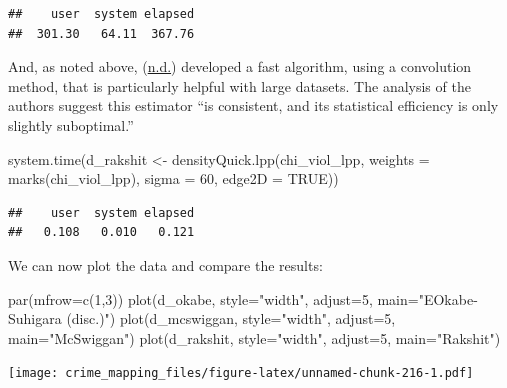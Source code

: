\documentclass[
  krantz2]{krantz}
\makeatletter
\newenvironment{Shaded}{\begin{snugshade}}{\end{snugshade}}
\newcommand{\AttributeTok}[1]{\textcolor[rgb]{0.61,0.61,0.61}{#1}}
\newcommand{\ConstantTok}[1]{\textcolor[rgb]{0,0,0}{#1}}
\newcommand{\DecValTok}[1]{\textcolor[rgb]{0.06,0.06,0.06}{#1}}
\newcommand{\FunctionTok}[1]{\textcolor[rgb]{0,0,0}{#1}}
\newcommand{\NormalTok}[1]{#1}
\newcommand{\OtherTok}[1]{\textcolor[rgb]{0.37,0.37,0.37}{#1}}
\newcommand{\StringTok}[1]{\textcolor[rgb]{0.5,0.5,0.5}{#1}}
\newenvironment{kframe}{%
\medskip{}
\setlength{\fboxsep}{.8em}
 \def\at@end@of@kframe{}%
 \ifinner\ifhmode%
  \def\at@end@of@kframe{\end{minipage}}%
  \begin{minipage}{\columnwidth}%
 \fi\fi%
 \def\FrameCommand##1{\hskip\@totalleftmargin \hskip-\fboxsep
 \colorbox{shadecolor}{##1}\hskip-\fboxsep
     \hskip-\linewidth \hskip-\@totalleftmargin \hskip\columnwidth}%
 \MakeFramed {\advance\hsize-\width
   \@totalleftmargin\z@ \linewidth\hsize
   \@setminipage}}%
 {\par\unskip\endMakeFramed%
 \at@end@of@kframe}
\renewenvironment{Shaded}{\begin{kframe}}{\end{kframe}}
\makeatother
\begin{document}
\begin{verbatim}
##    user  system elapsed 
##  301.30   64.11  367.76
\end{verbatim}

And, as noted above, (\protect\hyperlink{ref-Rakshit_2019}{n.d.}) developed a fast algorithm, using a convolution method, that is particularly helpful with large datasets. The analysis of the authors suggest this estimator ``is consistent, and its statistical efficiency is only slightly suboptimal.''

\begin{Shaded}
\begin{Highlighting}[]
\FunctionTok{system.time}\NormalTok{(d\_rakshit }\OtherTok{\textless{}{-}} \FunctionTok{densityQuick.lpp}\NormalTok{(chi\_viol\_lpp, }
                                    \AttributeTok{weights =} \FunctionTok{marks}\NormalTok{(chi\_viol\_lpp), }
                                    \AttributeTok{sigma =} \DecValTok{60}\NormalTok{,}
                                    \AttributeTok{edge2D =} \ConstantTok{TRUE}\NormalTok{))}
\end{Highlighting}
\end{Shaded}

\begin{verbatim}
##    user  system elapsed 
##   0.108   0.010   0.121
\end{verbatim}

We can now plot the data and compare the results:

\begin{Shaded}
\begin{Highlighting}[]
\FunctionTok{par}\NormalTok{(}\AttributeTok{mfrow=}\FunctionTok{c}\NormalTok{(}\DecValTok{1}\NormalTok{,}\DecValTok{3}\NormalTok{))}
\FunctionTok{plot}\NormalTok{(d\_okabe, }\AttributeTok{style=}\StringTok{"width"}\NormalTok{, }\AttributeTok{adjust=}\DecValTok{5}\NormalTok{, }\AttributeTok{main=}\StringTok{"EOkabe{-}Suhigara (disc.)"}\NormalTok{)}
\FunctionTok{plot}\NormalTok{(d\_mcswiggan, }\AttributeTok{style=}\StringTok{"width"}\NormalTok{, }\AttributeTok{adjust=}\DecValTok{5}\NormalTok{, }\AttributeTok{main=}\StringTok{"McSwiggan"}\NormalTok{)}
\FunctionTok{plot}\NormalTok{(d\_rakshit, }\AttributeTok{style=}\StringTok{"width"}\NormalTok{, }\AttributeTok{adjust=}\DecValTok{5}\NormalTok{, }\AttributeTok{main=}\StringTok{"Rakshit"}\NormalTok{)}
\end{Highlighting}
\end{Shaded}

\texttt{[image: crime\_mapping\_files/figure-latex/unnamed-chunk-216-1.pdf]}
\end{document}
